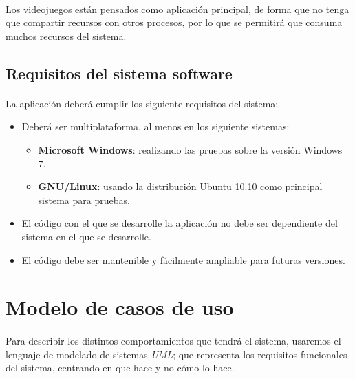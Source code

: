 \paragraph{}
Los videojuegos están pensados como aplicación principal, de forma que no tenga que compartir recursos con otros procesos,
por lo que se permitirá que consuma muchos recursos del sistema.

\subsection{Requisitos del sistema software}

\paragraph{}
La aplicación deberá cumplir los siguiente requisitos del sistema:

\begin{itemize}
    \item Deberá ser multiplataforma, al menos en los siguiente sistemas:
    \begin{itemize}
        \item \textbf{Microsoft Windows}: realizando las pruebas sobre la versión Windows 7.
        \item \textbf{GNU/Linux}: usando la distribución Ubuntu 10.10 como principal sistema para pruebas.
    \end{itemize}
    
    \item El código con el que se desarrolle la aplicación no debe ser
    dependiente del sistema en el que se desarrolle.
    
    \item El código debe ser mantenible y fácilmente ampliable para futuras versiones.
\end{itemize}

\section{Modelo de casos de uso}

\paragraph{}
Para describir los distintos comportamientos que tendrá el sistema, usaremos el lenguaje de modelado de sistemas \emph{UML}; que
representa los requisitos funcionales del sistema, centrando en que hace y no cómo lo hace.

